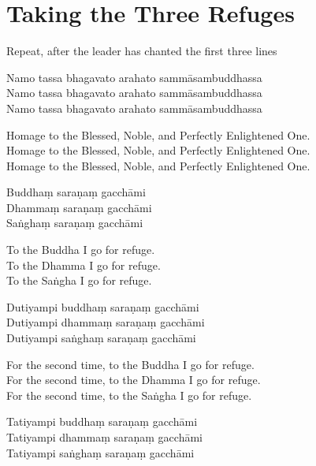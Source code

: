 \clearpage
\chapter{Taking the Three Refuges}

\begin{instruction}
  Repeat, after the leader has chanted the first three lines
\end{instruction}

Namo tassa bhagavato arahato sammāsambuddhassa\\
Namo tassa bhagavato arahato sammāsambuddhassa\\
Namo tassa bhagavato arahato sammāsambuddhassa

\begin{english}
  Homage to the Blessed, Noble, and Perfectly Enlightened One.\\
  Homage to the Blessed, Noble, and Perfectly Enlightened One.\\
  Homage to the Blessed, Noble, and Perfectly Enlightened One.
\end{english}

Buddhaṃ saraṇaṃ gacchāmi\\
Dhammaṃ saraṇaṃ gacchāmi\\
Saṅghaṃ saraṇaṃ gacchāmi

\begin{english}
  To the Buddha I go for refuge.\\
  To the Dhamma I go for refuge.\\
  To the Saṅgha I go for refuge.
\end{english}

Dutiyampi buddhaṃ saraṇaṃ gacchāmi\\
Dutiyampi dhammaṃ saraṇaṃ gacchāmi\\
Dutiyampi saṅghaṃ saraṇaṃ gacchāmi

\begin{english}
  For the second time, to the Buddha I go for refuge.\\
  For the second time, to the Dhamma I go for refuge.\\
  For the second time, to the Saṅgha I go for refuge.
\end{english}

Tatiyampi buddhaṃ saraṇaṃ gacchāmi\\
Tatiyampi dhammaṃ saraṇaṃ gacchāmi\\
Tatiyampi saṅghaṃ saraṇaṃ gacchāmi

\clearpage

